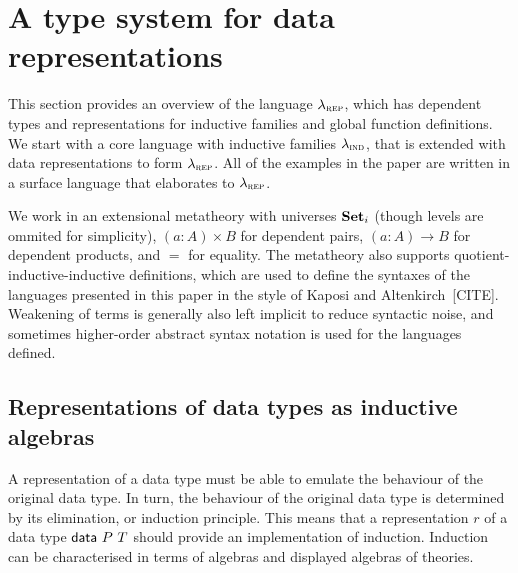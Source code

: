 \section{A type system for data representations}\label{sec:type-system}

This section provides an overview of the language $\lambda_{\textsc{rep}}$, which has
dependent types and representations for inductive families and global function
definitions. We start with a core language with inductive families $\lambda_{\textsc{ind}}$,
that is extended with data representations to form $\lambda_{\textsc{rep}}$. All of the
examples in the paper are written in a surface language that elaborates to
$\lambda_{\textsc{rep}}$.

We work in an extensional metatheory with universes $\mathbf{Set}_i$ (though levels are
ommited for simplicity), $(a : A) \times B$ for dependent pairs, $(a : A) \to B$
for dependent products, and $=$ for equality. The metatheory also supports
quotient-inductive-inductive definitions, which are used to define the syntaxes
of the languages presented in this paper in the style of Kaposi and
Altenkirch~[CITE]. Weakening of terms is generally also left implicit to reduce
syntactic noise, and sometimes higher-order abstract syntax notation is used for the
languages defined.







\newcommand{\ValidCase}{\mta{ValidCase}}

\subsection{Representations of data types as inductive algebras}

A representation of a data type must be able to emulate the behaviour of the
original data type. In turn, the behaviour of the original data type is
determined by its elimination, or induction principle. This means that a
representation $r$ of a data type $\textsf{data}\ P\ T$ should provide an
implementation of induction. Induction can be characterised in terms of algebras
and displayed algebras of theories.

